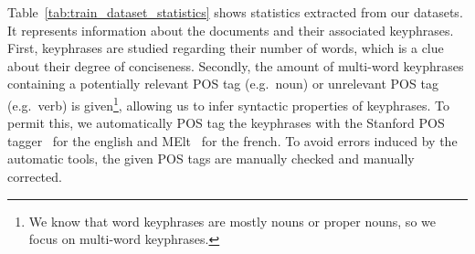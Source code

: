     Table~\ref{tab:train_dataset_statistics} shows statistics extracted from our
    datasets. It represents information about the documents and their associated
    keyphrases. First, keyphrases are studied regarding their number of words,
    which is a clue about their degree of conciseness. Secondly, the amount of
    multi-word keyphrases containing a potentially relevant POS tag (e.g.~noun)
    or unrelevant POS tag (e.g.~verb) is given\footnote{We know that word
    keyphrases are mostly nouns or proper nouns, so we focus on multi-word
    keyphrases.}, allowing us to infer syntactic properties of keyphrases. To
    permit this, we automatically POS tag the keyphrases with the Stanford POS
    tagger~\cite{toutanova2003stanfordpostagger} for the english and
    MElt~\cite{denis2009melt} for the french. To avoid errors induced by the
    automatic tools, the given POS tags are manually checked and manually
    corrected.
